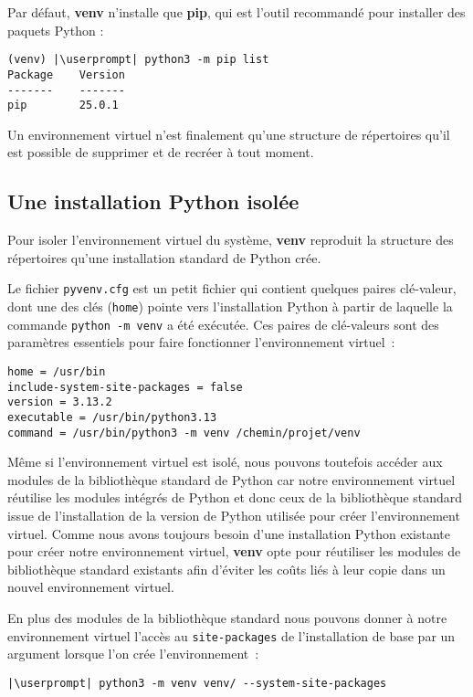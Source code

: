 Par défaut, \textbf{venv} n'installe que \textbf{pip}, qui est l'outil recommandé pour installer des paquets Python :
\begin{lstlisting}[style=bash]
(venv) |\userprompt| python3 -m pip list
Package    Version
-------    -------
pip        25.0.1
\end{lstlisting}

Un environnement virtuel n’est finalement qu’une structure de répertoires qu'il est possible de supprimer et de recréer à tout moment.

\subsection*{Une installation Python isolée}

Pour isoler l'environnement virtuel du système, \textbf{venv} reproduit la structure des répertoires qu’une installation standard de Python crée.

Le fichier \texttt{pyvenv.cfg} est un petit fichier qui contient quelques paires clé-valeur, dont une des clés (\texttt{home}) pointe vers l'installation Python à partir de laquelle la commande \texttt{python -m venv} a été exécutée. Ces paires de clé-valeurs sont des paramètres essentiels pour faire fonctionner l'environnement virtuel :
\begin{lstlisting}[style=file]
home = /usr/bin
include-system-site-packages = false
version = 3.13.2
executable = /usr/bin/python3.13
command = /usr/bin/python3 -m venv /chemin/projet/venv
\end{lstlisting}

Même si l'environnement virtuel est isolé, nous pouvons toutefois accéder aux modules de la bibliothèque standard de Python car notre environnement virtuel réutilise les modules intégrés de Python et donc ceux de la bibliothèque standard issue de l’installation de la version de Python utilisée pour créer l'environnement virtuel. Comme nous avons toujours besoin d’une installation Python existante pour créer notre environnement virtuel, \textbf{venv} opte pour réutiliser les modules de bibliothèque standard existants afin d’éviter les coûts liés à leur copie dans un nouvel environnement virtuel.

En plus des modules de la bibliothèque standard nous pouvons donner à notre environnement virtuel l’accès au \texttt{site-packages} de l’installation de base par un argument lorsque l'on crée l’environnement :
\begin{lstlisting}[style=bash]
|\userprompt| python3 -m venv venv/ --system-site-packages
\end{lstlisting}

